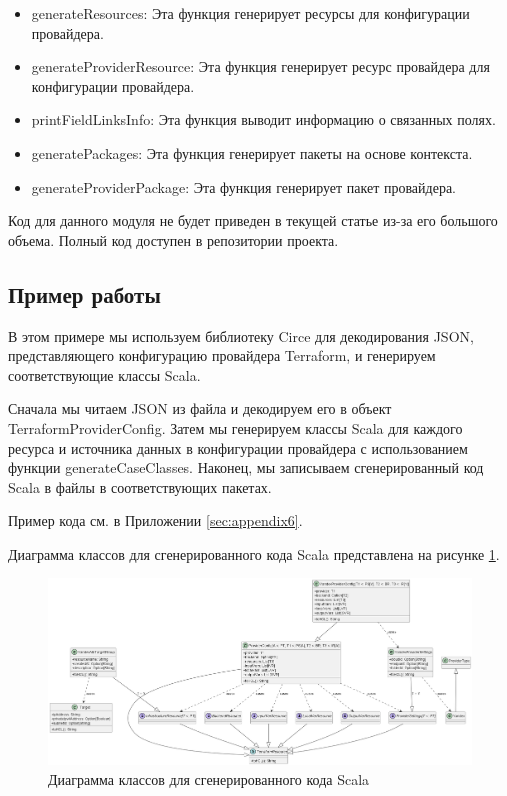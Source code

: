 \begin{itemize}
  \item generateResources: Эта функция генерирует ресурсы для конфигурации
провайдера.
  
  \item generateProviderResource: Эта функция генерирует ресурс провайдера для
конфигурации провайдера.
  
  \item printFieldLinksInfo: Эта функция выводит информацию о связанных полях.
  
  \item generatePackages: Эта функция генерирует пакеты на основе контекста.
  
  \item generateProviderPackage: Эта функция генерирует пакет провайдера.
\end{itemize}

Код для данного модуля не будет приведен в текущей статье из-за его большого
объема. Полный код доступен в репозитории проекта.

\subsection{Пример работы}

В этом примере мы используем библиотеку Circe для декодирования JSON,
представляющего конфигурацию провайдера Terraform, и генерируем соответствующие
классы Scala.

Сначала мы читаем JSON из файла и декодируем его в объект
TerraformProviderConfig. Затем мы генерируем классы Scala для каждого ресурса и
источника данных в конфигурации провайдера с использованием функции
generateCaseClasses. Наконец, мы записываем сгенерированный код Scala в файлы в
соответствующих пакетах.

Пример кода см. в Приложении \ref{sec:appendix6}.

Диаграмма классов для сгенерированного кода Scala представлена на рисунке
\ref{fig:uml2}.

\begin{figure}[h]
  \centering
  \includegraphics[scale=0.25]{img/6.png}
  \caption{Диаграмма классов для сгенерированного кода Scala}
  \label{fig:uml2}
\end{figure}

